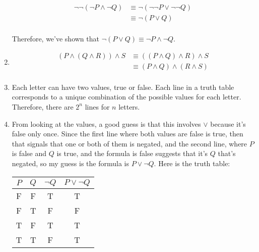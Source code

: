 \documentclass{article}
\begin{document}
\begin{enumerate}
  \begin{equation*}
    \begin{aligned}
      \lnot \lnot (\lnot P \land \lnot Q) & \equiv \lnot (\lnot \lnot P \lor \lnot \lnot Q) \\
      & \equiv \lnot (P \lor Q) \\
      \end{aligned}
  \end{equation*}

  Therefore, we've shown that $\lnot (P \lor Q) \equiv \lnot P \land \lnot Q$.

\item
  \begin{equation*}
    \begin{aligned}
      (P \land (Q \land R)) \land S & \equiv ((P \land Q) \land R) \land S \\
      & \equiv (P \land Q) \land (R \land S) \\
    \end{aligned}
  \end{equation*}

\item Each letter can have two values, true or false.  Each line in a truth table corresponds to a unique combination of the possible values for each letter.  Therefore, there are $2^n$ lines for $n$ letters.

\item From looking at the values, a good guess is that this involves $\lor$ because it's false only once.  Since the first line where both values are false is true, then that signals that one or both of them is negated, and the second line, where $P$ is false and $Q$ is true, and the formula is false suggests that it's $Q$ that's negated, so my guess is the formula is $P \lor \lnot Q$.  Here is the truth table:

  \begin{tabular}{c c c c}
    $P$ & $Q$ & $\lnot Q$ & $P \lor \lnot Q$ \\ \hline
    F & F & T & T \\
    F & T & F & F \\
    T & F & T & T \\
    T & T & F & T \\
    \end{tabular}

\end{enumerate}
\end{document}
